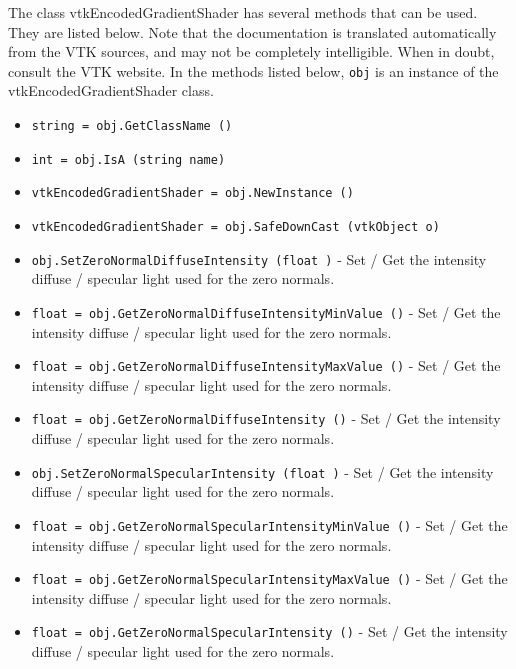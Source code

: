 The class vtkEncodedGradientShader has several methods that can be used.
  They are listed below.
Note that the documentation is translated automatically from the VTK sources,
and may not be completely intelligible.  When in doubt, consult the VTK website.
In the methods listed below, \verb|obj| is an instance of the vtkEncodedGradientShader class.
\begin{itemize}
\item  \verb|string = obj.GetClassName ()|

\item  \verb|int = obj.IsA (string name)|

\item  \verb|vtkEncodedGradientShader = obj.NewInstance ()|

\item  \verb|vtkEncodedGradientShader = obj.SafeDownCast (vtkObject o)|

\item  \verb|obj.SetZeroNormalDiffuseIntensity (float )| -  Set / Get the intensity diffuse / specular light used for the
 zero normals. 

\item  \verb|float = obj.GetZeroNormalDiffuseIntensityMinValue ()| -  Set / Get the intensity diffuse / specular light used for the
 zero normals. 

\item  \verb|float = obj.GetZeroNormalDiffuseIntensityMaxValue ()| -  Set / Get the intensity diffuse / specular light used for the
 zero normals. 

\item  \verb|float = obj.GetZeroNormalDiffuseIntensity ()| -  Set / Get the intensity diffuse / specular light used for the
 zero normals. 

\item  \verb|obj.SetZeroNormalSpecularIntensity (float )| -  Set / Get the intensity diffuse / specular light used for the
 zero normals. 

\item  \verb|float = obj.GetZeroNormalSpecularIntensityMinValue ()| -  Set / Get the intensity diffuse / specular light used for the
 zero normals. 

\item  \verb|float = obj.GetZeroNormalSpecularIntensityMaxValue ()| -  Set / Get the intensity diffuse / specular light used for the
 zero normals. 

\item  \verb|float = obj.GetZeroNormalSpecularIntensity ()| -  Set / Get the intensity diffuse / specular light used for the
 zero normals. 


\end{itemize}
